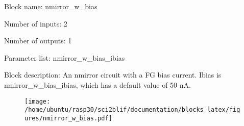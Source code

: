 \pagebreak

Block name: nmirror\_w\_bias

Number of inputs: 2

Number of outputs: 1

Parameter list: nmirror\_w\_bias\_ibias

Block description: 
An nmirror circuit with a FG bias current. Ibias is nmirror\_w\_bias\_ibias, which has a default value of 50 nA.

\begin{figure}[H]  %
\texttt{[image: /home/ubuntu/rasp30/sci2blif/documentation/blocks\_latex/figures/nmirror\_w\_bias.pdf]}
\end{figure}

